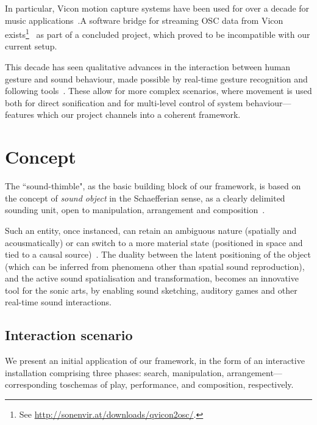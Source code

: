 In particular, Vicon motion capture systems have been used for over a decade for music applications~\cite{dobrian2003gestural,kapur2005framework,eckel2009motion,vigliensoni2012quantitative}.\linebreak A software bridge for streaming OSC data from Vicon \linebreak exists\footnote{See \url{http://sonenvir.at/downloads/qvicon2osc/}.}~\cite{eckel2009motion} as part of a concluded project, which proved to be incompatible with our current setup.

This decade has seen qualitative advances in the interaction between human gesture and sound behaviour, made possible by real-time gesture recognition and following tools~\cite{caramiaux2014mapping,caramiaux2015adaptive,probabilisticmodels}. These allow for more complex scenarios, where movement is used both for direct sonification and for multi-level control of system behaviour---features which our project channels into a coherent framework.

\section{Concept}
\label{sec:proj}


The ``sound-thimble", as the basic building block of our framework, is based on the concept of \textit{sound object} in the Schaefferian sense, as a clearly delimited sounding unit, open to manipulation, arrangement and composition~\cite{schaeffer1998solfege}.

Such an entity, once instanced, can retain an ambiguous nature (spatially and acousmatically) or can switch to a more material state (positioned in space and tied to a causal source)~\cite{soundunseen}. The duality between the latent positioning of the object (which can be inferred from phenomena other than spatial sound reproduction), and the active sound spatialisation and transformation, becomes an innovative tool for the sonic arts, by enabling sound sketching, auditory games and other real-time sound interactions. 

\subsection{Interaction scenario}
\label{sec:scenario}

We present an initial application of our framework, in the form of an interactive installation comprising three phases: search, manipulation, arrangement---corresponding to\linebreak schemas of play, performance, and composition, respectively.

